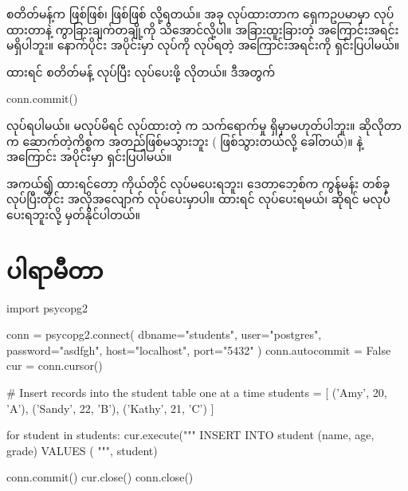 စတိတ်မန့်က    ဖြစ်ဖြစ်၊  ဖြစ်ဖြစ်  လို့ရတယ်။ အခု  လုပ်ထားတာက ရှေကဥပမာမှာ  လုပ်ထားတာနဲ့ ကွာခြားချက်တချို့ကို သိအောင်လို့ပါ။ အခြားထူးခြားတဲ့ အကြောင်းအရင်း မရှိပါဘူး။ နောက်ပိုင်း  အပိုင်းမှာ  လုပ်ကို လုပ်ရတဲ့ အကြောင်းအရင်းကို ရှင်းပြပါမယ်။


  ထားရင်  စတိတ်မန့်  လုပ်ပြီး  လုပ်ပေးဖို့ လိုတယ်။ ဒီအတွက်
%
\begin{py}
conn.commit()
\end{py}
%
လုပ်ရပါမယ်။  မလုပ်မိရင်  လုပ်ထားတဲ့  က သက်ရောက်မှု ရှိမှာမဟုတ်ပါဘူး။ ဆိုလိုတာက  ဆောက်တဲ့ကိစ္စက အတည်ဖြစ်မသွားဘူး ( ဖြစ်သွားတယ်လို့ ခေါ်တယ်)။  နဲ့  အကြောင်း  အပိုင်းမှာ ရှင်းပြပါမယ်။

အကယ်၍   ထားရင်တော့ ကိုယ်တိုင်  လုပ်မပေးရဘူး၊ ဒေတာဘေ့စ်က  ကွန်မန်း တစ်ခု  လုပ်ပြီးတိုင်း အလိုအလျောက်  လုပ်ပေးမှာပါ။  ထားရင်  လုပ်ပေးရမယ်၊  ဆိုရင် မလုပ်ပေးရဘူးလို့ မှတ်နိုင်ပါတယ်။


\section{ပါရာမီတာ}

%
\begin{py}
import psycopg2

conn = psycopg2.connect(
    dbname="students",
    user="postgres",
    password="asdfgh",
    host="localhost",
    port="5432"
)
conn.autocommit = False
cur = conn.cursor()

# Insert records into the student table one at a time
students = [
    ('Amy', 20, 'A'),
    ('Sandy', 22, 'B'),
    ('Kathy', 21, 'C')
]

for student in students:
    cur.execute("""
        INSERT INTO student (name, age, grade)
        VALUES (%
    """, student)

conn.commit()
cur.close()
conn.close()

\end{py}
%

